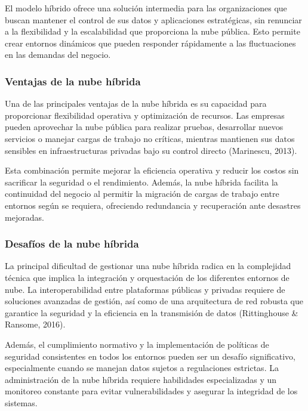 {            El modelo h{\'i}brido ofrece una soluci{\'o}n intermedia para las organizaciones que buscan mantener el control de sus datos y aplicaciones estrat{\'e}gicas, sin renunciar a la flexibilidad y la escalabilidad que proporciona la nube p{\'u}blica. Esto permite crear entornos din{\'a}micos que pueden responder r{\'a}pidamente a las fluctuaciones en las demandas del negocio.
            
            \subsubsection{Ventajas de la nube h{\'i}brida}
                Una de las principales ventajas de la nube h{\'i}brida es su capacidad para proporcionar flexibilidad operativa y optimizaci{\'o}n de recursos. Las empresas pueden aprovechar la nube p{\'u}blica para realizar pruebas, desarrollar nuevos servicios o manejar cargas de trabajo no cr{\'i}ticas, mientras mantienen sus datos sensibles en infraestructuras privadas bajo su control directo (Marinescu, 2013).
                
                Esta combinaci{\'o}n permite mejorar la eficiencia operativa y reducir los costos sin sacrificar la seguridad o el rendimiento. Adem{\'a}s, la nube h{\'i}brida facilita la continuidad del negocio al permitir la migraci{\'o}n de cargas de trabajo entre entornos seg{\'u}n se requiera, ofreciendo redundancia y recuperaci{\'o}n ante desastres mejoradas.
            \subsubsection{Desaf{\'i}os de la nube h{\'i}brida}
                La principal dificultad de gestionar una nube h{\'i}brida radica en la complejidad t{\'e}cnica que implica la integraci{\'o}n y orquestaci{\'o}n de los diferentes entornos de nube. La interoperabilidad entre plataformas p{\'u}blicas y privadas requiere de soluciones avanzadas de gesti{\'o}n, as{\'i} como de una arquitectura de red robusta que garantice la seguridad y la eficiencia en la transmisi{\'o}n de datos (Rittinghouse \& Ransome, 2016).
                
                Adem{\'a}s, el cumplimiento normativo y la implementaci{\'o}n de pol{\'i}ticas de seguridad consistentes en todos los entornos pueden ser un desaf{\'i}o significativo, especialmente cuando se manejan datos sujetos a regulaciones estrictas. La administraci{\'o}n de la nube h{\'i}brida requiere habilidades especializadas y un monitoreo constante para evitar vulnerabilidades y asegurar la integridad de los sistemas.
                
}
